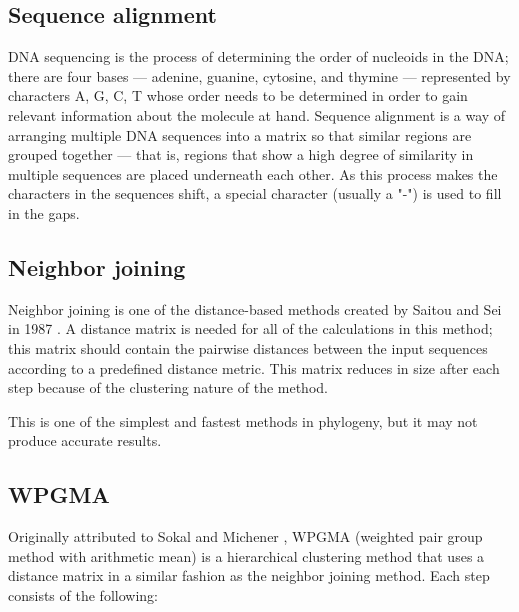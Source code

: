 \documentclass[11pt,twocolumn]{article}
\begin{document}
\subsection*{Sequence alignment}

DNA sequencing is the process of determining the order of nucleoids in the DNA; there are four bases — adenine, guanine, cytosine, and thymine — represented by characters A, G, C, T whose order needs to be determined in order to gain relevant information about the molecule at hand. Sequence alignment is a way of arranging multiple DNA sequences into a matrix so that similar regions are grouped together — that is, regions that show a high degree of similarity in multiple sequences are placed underneath each other. As this process makes the characters in the sequences shift, a special character (usually a "-") is used to fill in the gaps.

\subsection*{Neighbor joining}

Neighbor joining is one of the distance-based methods created by Saitou and Sei in 1987 \cite{1987}. A distance matrix is needed for all of the calculations in this method; this matrix should contain the pairwise distances between the input sequences according to a predefined distance metric. This matrix reduces in size after each step because of the clustering nature of the method.


This is one of the simplest and fastest methods in phylogeny, but it may not produce accurate results.

\subsection*{WPGMA}

Originally attributed to Sokal and Michener \cite{sokal58}, WPGMA (weighted pair group method with arithmetic mean) is a hierarchical clustering method that uses a distance matrix in a similar fashion as the neighbor joining method. Each step consists of the following:
\end{document}
